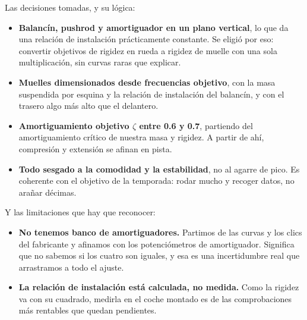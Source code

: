 \begin{caso}
Las decisiones tomadas, y su lógica:

\begin{itemize}
  \item \textbf{Balancín, pushrod y amortiguador en un plano vertical}, lo que
        da una relación de instalación prácticamente constante. Se eligió por
        eso: convertir objetivos de rigidez en rueda a rigidez de muelle con
        una sola multiplicación, sin curvas raras que explicar.
  \item \textbf{Muelles dimensionados desde frecuencias objetivo}, con la masa
        suspendida por esquina y la relación de instalación del balancín, y con
        el trasero algo más alto que el delantero.
  \item \textbf{Amortiguamiento objetivo $\zeta$ entre \num{0.6} y \num{0.7}},
        partiendo del amortiguamiento crítico de nuestra masa y rigidez. A
        partir de ahí, compresión y extensión se afinan en pista.
  \item \textbf{Todo sesgado a la comodidad y la estabilidad}, no al agarre de
        pico. Es coherente con el objetivo de la temporada: rodar mucho y
        recoger datos, no arañar décimas.
\end{itemize}

Y las limitaciones que hay que reconocer:

\begin{itemize}
  \item \textbf{No tenemos banco de amortiguadores.} Partimos de las curvas y
        los clics del fabricante y afinamos con los potenciómetros de
        amortiguador. Significa que no sabemos si los cuatro son iguales, y esa
        es una incertidumbre real que arrastramos a todo el ajuste.
  \item \textbf{La relación de instalación está calculada, no medida.} Como la
        rigidez va con su cuadrado, medirla en el coche montado es de las
        comprobaciones más rentables que quedan pendientes.
\end{itemize}

\medskip
{}
\end{caso}

